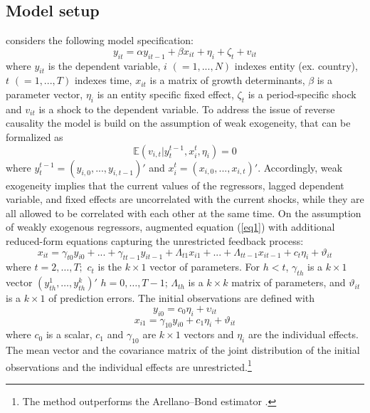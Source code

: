 \documentclass[a4paper]{article}
\begin{document}
\subsection{Model setup}
\noindent \citet{Moral+2016} considers the following model specification:
\begin{equation}\label{eq1}
    y_{it}=\alpha y_{it-1}+\beta x_{it}+\eta_{i}+\zeta_{t}+v_{it}
\end{equation}
\noindent where $y_{it}$ is the dependent variable, $i$ $(=1,...,N)$ indexes entity (ex. country), $t$ $(=1,...,T)$ indexes time, $x_{it}$ is a matrix of growth determinants, $\beta$ is a parameter vector, $\eta_{i}$ is an entity specific fixed effect, $\zeta_{t}$ is a period-specific shock and $v_{it}$ is a shock to the dependent variable.
To address the issue of reverse causality the model is build on the assumption of weak exogeneity, that can be formalized as
\begin{equation}\label{eq2}
    \mathbb{E}(v_{i,t}|y^{t-1}_{t},x^{t}_{i},\eta_{i})=0
\end{equation}
\noindent where $y^{t-1}_{t}=(y_{i,0},...,y_{i,t-1})'$ and $x^t_{i}=(x_{i,0},...,x_{i,t})'$.
Accordingly, weak exogeneity implies that the current values of the regressors, lagged dependent variable, and fixed effects are uncorrelated with the current shocks, while they are all allowed to be correlated with each other at the same time.
On the assumption of weakly exogenous regressors, \citet{Moral+2013} augmented equation (\ref{eq1}) with additional reduced-form equations capturing the unrestricted feedback process:
\begin{equation}\label{eq3}
x_{it}=\gamma_{t0}y_{i0}+...+\gamma_{tt-1}y_{it-1}+\Lambda_{t1}x_{i1}+...+\Lambda_{tt-1}x_{it-1}+c_{t}\eta_{i}+\vartheta_{it}
\end{equation}
\noindent where $t=2,\dots ,T;$ $c_{t}$ is the $k\times 1$ vector of parameters.
For $h<t$, $\gamma_{th}$ is a $k\times 1$ vector $(y_{th}^{1},\dots,y_{th}^{k})'$  $h=0,\dots,T-1$; $\Lambda_{th}$ is a $k\times k$ matrix of parameters, and $\vartheta_{it}$ is a $k\times 1$ of prediction errors. The initial observations are defined with
\begin{equation}\label{eq4}
    y_{i0}=c_{0}\eta_{i}+\upsilon_{it}
\end{equation}
\begin{equation}\label{eq5}
    x_{i1}=\gamma_{10}y_{i0}+c_{1}\eta_{i}+\vartheta_{it}
\end{equation}
\noindent where $c_{0}$ is a scalar, $c_{1}$ and $\gamma_{10}$ are $k\times 1$ vectors and $\eta_{i}$ are the individual effects. The mean vector and the covariance matrix of the joint distribution of the initial observations and the individual effects are unrestricted.\footnote{The method outperforms the Arellano--Bond estimator \citep{Moral+2019}.}
\end{document}
